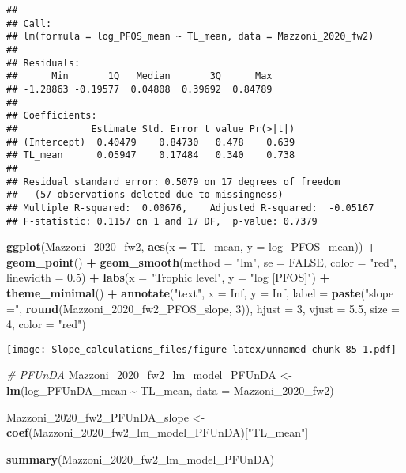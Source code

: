 \documentclass[
]{article}
\newenvironment{Shaded}{\begin{snugshade}}{\end{snugshade}}
\newcommand{\AttributeTok}[1]{\textcolor[rgb]{0.13,0.29,0.53}{#1}}
\newcommand{\CommentTok}[1]{\textcolor[rgb]{0.56,0.35,0.01}{\textit{#1}}}
\newcommand{\ConstantTok}[1]{\textcolor[rgb]{0.56,0.35,0.01}{#1}}
\newcommand{\DecValTok}[1]{\textcolor[rgb]{0.00,0.00,0.81}{#1}}
\newcommand{\FloatTok}[1]{\textcolor[rgb]{0.00,0.00,0.81}{#1}}
\newcommand{\FunctionTok}[1]{\textcolor[rgb]{0.13,0.29,0.53}{\textbf{#1}}}
\newcommand{\NormalTok}[1]{#1}
\newcommand{\OtherTok}[1]{\textcolor[rgb]{0.56,0.35,0.01}{#1}}
\newcommand{\SpecialCharTok}[1]{\textcolor[rgb]{0.81,0.36,0.00}{\textbf{#1}}}
\newcommand{\StringTok}[1]{\textcolor[rgb]{0.31,0.60,0.02}{#1}}
\begin{document}
\begin{verbatim}
## 
## Call:
## lm(formula = log_PFOS_mean ~ TL_mean, data = Mazzoni_2020_fw2)
## 
## Residuals:
##      Min       1Q   Median       3Q      Max 
## -1.28863 -0.19577  0.04808  0.39692  0.84789 
## 
## Coefficients:
##             Estimate Std. Error t value Pr(>|t|)
## (Intercept)  0.40479    0.84730   0.478    0.639
## TL_mean      0.05947    0.17484   0.340    0.738
## 
## Residual standard error: 0.5079 on 17 degrees of freedom
##   (57 observations deleted due to missingness)
## Multiple R-squared:  0.00676,    Adjusted R-squared:  -0.05167 
## F-statistic: 0.1157 on 1 and 17 DF,  p-value: 0.7379
\end{verbatim}

\begin{Shaded}
\begin{Highlighting}[]
\FunctionTok{ggplot}\NormalTok{(Mazzoni\_2020\_fw2, }\FunctionTok{aes}\NormalTok{(}\AttributeTok{x =}\NormalTok{ TL\_mean, }\AttributeTok{y =}\NormalTok{ log\_PFOS\_mean)) }\SpecialCharTok{+}
  \FunctionTok{geom\_point}\NormalTok{() }\SpecialCharTok{+}
  \FunctionTok{geom\_smooth}\NormalTok{(}\AttributeTok{method =} \StringTok{"lm"}\NormalTok{, }\AttributeTok{se =} \ConstantTok{FALSE}\NormalTok{, }\AttributeTok{color =} \StringTok{"red"}\NormalTok{, }\AttributeTok{linewidth =} \FloatTok{0.5}\NormalTok{) }\SpecialCharTok{+}
  \FunctionTok{labs}\NormalTok{(}\AttributeTok{x =} \StringTok{"Trophic level"}\NormalTok{,}
       \AttributeTok{y =} \StringTok{"log [PFOS]"}\NormalTok{) }\SpecialCharTok{+}
  \FunctionTok{theme\_minimal}\NormalTok{() }\SpecialCharTok{+}
  \FunctionTok{annotate}\NormalTok{(}\StringTok{"text"}\NormalTok{, }\AttributeTok{x =} \ConstantTok{Inf}\NormalTok{, }\AttributeTok{y =} \ConstantTok{Inf}\NormalTok{, }\AttributeTok{label =} \FunctionTok{paste}\NormalTok{(}\StringTok{"slope ="}\NormalTok{, }\FunctionTok{round}\NormalTok{(Mazzoni\_2020\_fw2\_PFOS\_slope, }\DecValTok{3}\NormalTok{)), }
           \AttributeTok{hjust =} \DecValTok{3}\NormalTok{, }\AttributeTok{vjust =} \FloatTok{5.5}\NormalTok{, }\AttributeTok{size =} \DecValTok{4}\NormalTok{, }\AttributeTok{color =} \StringTok{"red"}\NormalTok{)}
\end{Highlighting}
\end{Shaded}

\texttt{[image: Slope\_calculations\_files/figure-latex/unnamed-chunk-85-1.pdf]}

\begin{Shaded}
\begin{Highlighting}[]
\CommentTok{\# PFUnDA}
\NormalTok{Mazzoni\_2020\_fw2\_lm\_model\_PFUnDA }\OtherTok{\textless{}{-}} \FunctionTok{lm}\NormalTok{(log\_PFUnDA\_mean }\SpecialCharTok{\textasciitilde{}}\NormalTok{ TL\_mean,}
                                      \AttributeTok{data =}\NormalTok{ Mazzoni\_2020\_fw2)}

\NormalTok{Mazzoni\_2020\_fw2\_PFUnDA\_slope }\OtherTok{\textless{}{-}} \FunctionTok{coef}\NormalTok{(Mazzoni\_2020\_fw2\_lm\_model\_PFUnDA)[}\StringTok{"TL\_mean"}\NormalTok{]}

\FunctionTok{summary}\NormalTok{(Mazzoni\_2020\_fw2\_lm\_model\_PFUnDA)}
\end{Highlighting}
\end{Shaded}
\end{document}
